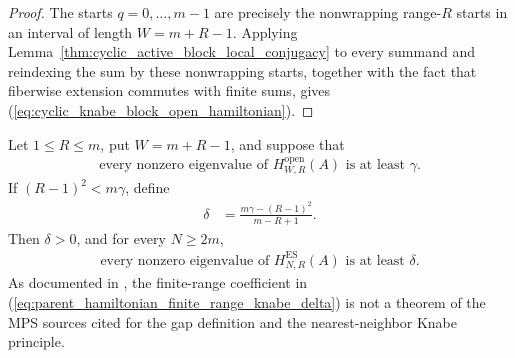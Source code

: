 \begin{proof}
    \leanok
    The starts $q=0,\ldots,m-1$ are precisely the nonwrapping range-$R$
    starts in an interval of length $W=m+R-1$.  Applying
    Lemma~\ref{thm:cyclic_active_block_local_conjugacy} to every summand and
    reindexing the sum by these nonwrapping starts, together with the fact that
    fiberwise extension commutes with finite sums, gives
    (\ref{eq:cyclic_knabe_block_open_hamiltonian}).
\end{proof}

\begin{lemma}
    \label{thm:parent_hamiltonian_gap_from_open_knabe_block}
    \leanok
    Let $1\leq R\leq m$, put $W=m+R-1$, and suppose that
    \begin{align}
        \text{every nonzero eigenvalue of }H^{\mathrm{open}}_{W,R}(A)
        \text{ is at least }\gamma.
        \label{eq:open_knabe_block_norm_gap}
    \end{align}
    If $(R-1)^2<m\gamma$, define
    \begin{align}
        \delta
         & =\frac{m\gamma-(R-1)^2}{m-R+1}.
        \label{eq:parent_hamiltonian_finite_range_knabe_delta}
    \end{align}
    Then $\delta>0$, and for every $N\geq2m$,
    \begin{align}
        \text{every nonzero eigenvalue of }H_{N,R}^{\mathrm{ES}}(A)
        \text{ is at least }\delta.
        \label{eq:parent_hamiltonian_finite_range_knabe_gap}
    \end{align}
    As documented in
    , the
    finite-range coefficient in
    (\ref{eq:parent_hamiltonian_finite_range_knabe_delta}) is not a theorem of
    the MPS sources cited for the gap definition and the nearest-neighbor
    Knabe principle.
\end{lemma}


